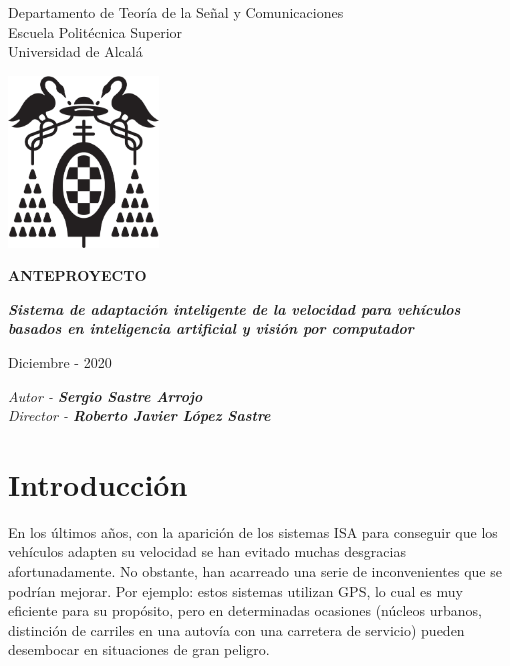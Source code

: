 \documentclass[12pt,oneside,a4paper]{article}
\begin{document}
\thispagestyle{empty}

\begin{center}


Departamento de Teoría de la Señal y Comunicaciones\\
Escuela Politécnica Superior\\
Universidad de Alcalá\\

\vspace{1cm}

\includegraphics[width=4cm]{figuras/logo-uah.eps}

\textbf{ANTEPROYECTO}

\vspace{1cm}

\begin{large}\textbf{\textit{Sistema de adaptación inteligente de la velocidad para vehículos basados en inteligencia artificial y visión por computador}}\end{large}

\vfill

Diciembre - 2020

\end{center}

\begin{flushright}
\textit{Autor - \textbf{Sergio Sastre Arrojo}} \\
\textit{Director - \textbf{Roberto Javier López Sastre}}
\end{flushright}

\newpage

\section{Introducción}

En los últimos años, con la aparición de los sistemas ISA para conseguir que los vehículos adapten su velocidad se han evitado muchas desgracias afortunadamente. No obstante, han acarreado una serie de inconvenientes que se podrían mejorar. Por ejemplo: estos sistemas utilizan GPS, lo cual es muy eficiente para su propósito, pero en determinadas ocasiones (núcleos urbanos, distinción de carriles en una autovía con una carretera de servicio) pueden desembocar en situaciones de gran peligro.
\end{document}
